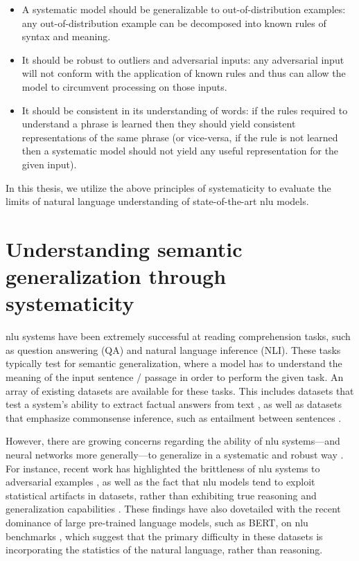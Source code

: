 \documentclass[letterpaper, 12pt]{report}
\begin{document}
\begin{itemize}
  \item A systematic model should be generalizable to out-of-distribution examples: any out-of-distribution example can be decomposed into known rules of syntax and meaning.
  \item It should be robust to outliers and adversarial inputs: any adversarial input will not conform with the application of known rules and thus can allow the model to circumvent processing on those inputs.
  \item It should be consistent in its understanding of words: if the rules required to understand a phrase is learned then they should yield consistent representations of the same phrase (or vice-versa, if the rule is not learned then a systematic model should not yield any useful representation for the given input).
\end{itemize}

In this thesis, we utilize the above principles of systematicity to evaluate the limits of natural language understanding of state-of-the-art \acrshort{nlu} models.

\clearpage

\chapter{Understanding semantic generalization through systematicity}
\label{chap:clutrr}

\gls{nlu} systems have been extremely successful at reading comprehension tasks, such as question answering (QA) and natural language inference (NLI).
These tasks typically test for semantic generalization, where a model has to understand the meaning of the input sentence / passage in order to perform the given task.
An array of existing datasets are available for these tasks. This includes datasets that test a system's ability to extract factual answers from text \citep{Rajpurkar2016-yc,Nguyen2016-ec,Trischler2016-fc,Mostafazadeh2016-hu,Su2016-so}, as well as datasets that emphasize commonsense inference, such as entailment between sentences \citep{bowman2015large,williams2018broad}.

However, there are growing concerns regarding the ability of \acrshort{nlu} systems---and neural networks more generally---to generalize in a systematic and robust way \citep{bahdanau2018systematic,lake2017generalization,Johnson2016-mw}.
For instance, recent work has highlighted the brittleness of \acrshort{nlu} systems to adversarial examples \citep{jia2017adversarial}, as well as the fact that \acrshort{nlu} models tend to exploit statistical artifacts in datasets, rather than exhibiting true reasoning and generalization capabilities \citep{gururangan2018annotation,kaushik2018much}.
These findings have also dovetailed with the recent dominance of large pre-trained language models, such as BERT, on \acrshort{nlu} benchmarks \citep{devlin2018bert,peters2018deep}, which suggest that the primary difficulty in these datasets is incorporating the statistics of the natural language, rather than reasoning.
\end{document}
